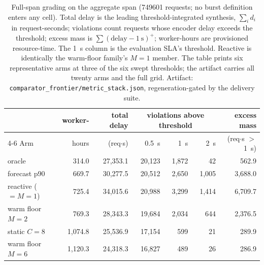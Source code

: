 \begin{table}[htbp]
\centering
\caption[Convention-minimized metric stack, aggregate span]{Full-span
grading on the aggregate span (\num{749601} requests; no burst definition
enters any cell). Total delay is the leading threshold-integrated
synthesis, $\sum_i d_i$ in request-seconds; violations count requests whose encoder
delay exceeds the threshold; excess mass is
$\sum(\text{delay}-\SI{1}{\second})^{+}$; worker-hours are provisioned
resource-time. The \SI{1}{\second} column is the evaluation SLA's
threshold. Reactive is identically the warm-floor family's $M{=}1$ member.
The table prints six representative arms at three of the six swept
thresholds; the artifact carries all twenty arms and the full grid.
Artifact: \texttt{comparator\_frontier/metric\_stack.json},
regeneration-gated by the delivery suite.}
\label{tab:cl-metric-stack}
\small
\setlength{\tabcolsep}{4pt}
\begin{tabular}{@{}lrrrrrr@{}}
\toprule
& worker- & total delay & \multicolumn{3}{c}{violations above threshold} & excess mass \\
\cmidrule(lr){4-6}
Arm & hours & (req$\cdot$s) & \SI{0.5}{\second} & \SI{1}{\second} & \SI{2}{\second} &
(req$\cdot$s $>$ \SI{1}{\second}) \\
\midrule
oracle              & 314.0   & 27{,}353.1 & 20{,}123 & 1{,}872 & 42    & 562.9 \\
forecast p90        & 669.7   & 30{,}277.5 & 20{,}512 & 2{,}650 & 1{,}005 & 3{,}688.0 \\
reactive ($=M{=}1$) & 725.4   & 34{,}015.6 & 20{,}988 & 3{,}299 & 1{,}414 & 6{,}709.7 \\
warm floor $M{=}2$  & 769.3   & 28{,}343.3 & 19{,}684 & 2{,}034 & 644   & 2{,}376.5 \\
static $C{=}8$      & 1{,}074.8 & 25{,}536.9 & 17{,}154 & 599   & 21    & 289.9 \\
warm floor $M{=}6$  & 1{,}120.3 & 24{,}318.3 & 16{,}827 & 489   & 26    & 286.9 \\
\bottomrule
\end{tabular}
\end{table}

